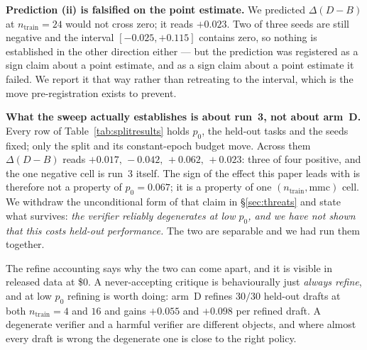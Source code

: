 \documentclass[11pt]{article}
\newcommand{\dd}{\ensuremath{\Delta}}
\begin{document}
\textbf{Prediction (ii) is falsified on the point estimate.} We predicted $\dd(D-B)$ at
$n_{\mathrm{train}}{=}24$ would not cross zero; it reads $+0.023$. Two of three seeds are still
negative and the interval $[-0.025,+0.115]$ contains zero, so nothing is established in the
other direction either --- but the prediction was registered as a sign claim about a point
estimate, and as a sign claim about a point estimate it failed. We report it that way rather
than retreating to the interval, which is the move pre-registration exists to prevent.

\textbf{What the sweep actually establishes is about run~3, not about arm~D.} Every row of
Table~\ref{tab:splitresults} holds $p_0$, the held-out tasks and the seeds fixed; only the
split and its constant-epoch budget move. Across them $\dd(D-B)$ reads
$+0.017,\,-0.042,\,+0.062,\,+0.023$: three of four positive, and the one negative cell is
run~3 itself. The sign of the effect this paper leads with is therefore not a property of
$p_0 = 0.067$; it is a property of one $(n_{\mathrm{train}}, \mathrm{mmc})$ cell. We withdraw
the unconditional form of that claim in \S\ref{sec:threats} and state what survives:
\emph{the verifier reliably degenerates at low $p_0$, and we have not shown that this costs
held-out performance.} The two are separable and we had run them together.

The refine accounting says why the two can come apart, and it is visible in released data at
\$0. A never-accepting critique is behaviourally just \emph{always refine}, and at low $p_0$
refining is worth doing: arm~D refines $30/30$ held-out drafts at both $n_{\mathrm{train}}{=}4$
and $16$ and gains $+0.055$ and $+0.098$ per refined draft. A degenerate verifier and a harmful
verifier are different objects, and where almost every draft is wrong the degenerate one is
close to the right policy.
\end{document}
